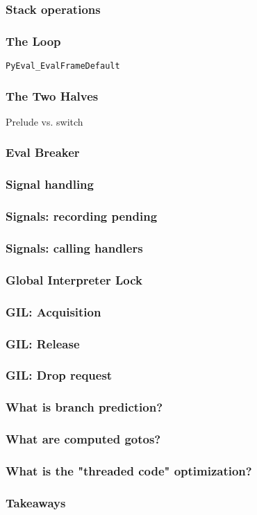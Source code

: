\begin{frame}
\frametitle{Stack operations}
\end{frame}

\begin{frame}[fragile]
\frametitle{The Loop}
\verb|PyEval_EvalFrameDefault|
\end{frame}

\begin{frame}
\frametitle{The Two Halves}
Prelude vs. switch
\end{frame}

\begin{frame}
\frametitle{Eval Breaker}
\end{frame}

\begin{frame}
\frametitle{Signal handling}
\end{frame}

\begin{frame}
\frametitle{Signals: recording pending}
\end{frame}

\begin{frame}
\frametitle{Signals: calling handlers}
\end{frame}

\begin{frame}
\frametitle{Global Interpreter Lock}
\end{frame}

\begin{frame}
\frametitle{GIL: Acquisition}
\end{frame}

\begin{frame}
\frametitle{GIL: Release}
\end{frame}

\begin{frame}
\frametitle{GIL: Drop request}
\end{frame}

\begin{frame}
\frametitle{What is branch prediction?}
\end{frame}

\begin{frame}
\frametitle{What are computed gotos?}
\end{frame}

\begin{frame}
\frametitle{What is the "threaded code" optimization?}
\end{frame}

\begin{frame}
\frametitle{Takeaways}
\end{frame}


